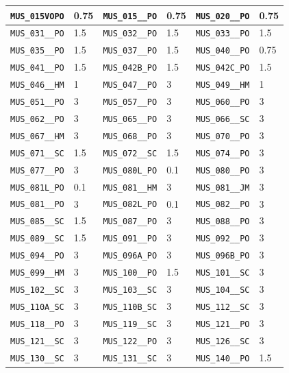 \begin{longtable}{|l|l||l|l||l|l|}
    \verb|MUS_015VOPO| & 0.75 & \verb|MUS_015__PO| & 0.75 & \verb|MUS_020__PO| & 0.75\\\hline
    \verb|MUS_031__PO| & 1.5 & \verb|MUS_032__PO| & 1.5 & \verb|MUS_033__PO| & 1.5\\\hline
    \verb|MUS_035__PO| & 1.5 & \verb|MUS_037__PO| & 1.5 & \verb|MUS_040__PO| & 0.75\\\hline
    \verb|MUS_041__PO| & 1.5 & \verb|MUS_042B_PO| & 1.5 & \verb|MUS_042C_PO| & 1.5\\\hline
    \verb|MUS_046__HM| & 1 & \verb|MUS_047__PO| & 3 & \verb|MUS_049__HM| & 1\\\hline
    \verb|MUS_051__PO| & 3 & \verb|MUS_057__PO| & 3 & \verb|MUS_060__PO| & 3\\\hline
    \verb|MUS_062__PO| & 3 & \verb|MUS_065__PO| & 3 & \verb|MUS_066__SC| & 3\\\hline
    \verb|MUS_067__HM| & 3 & \verb|MUS_068__PO| & 3 & \verb|MUS_070__PO| & 3\\\hline
    \verb|MUS_071__SC| & 1.5 & \verb|MUS_072__SC| & 1.5 & \verb|MUS_074__PO| & 3\\\hline
    \verb|MUS_077__PO| & 3 & \verb|MUS_080L_PO| & 0.1 & \verb|MUS_080__PO| & 3\\\hline
    \verb|MUS_081L_PO| & 0.1 & \verb|MUS_081__HM| & 3 & \verb|MUS_081__JM| & 3\\\hline
    \verb|MUS_081__PO| & 3 & \verb|MUS_082L_PO| & 0.1 & \verb|MUS_082__PO| & 3\\\hline
    \verb|MUS_085__SC| & 1.5 & \verb|MUS_087__PO| & 3 & \verb|MUS_088__PO| & 3\\\hline
    \verb|MUS_089__SC| & 1.5 & \verb|MUS_091__PO| & 3 & \verb|MUS_092__PO| & 3\\\hline
    \verb|MUS_094__PO| & 3 & \verb|MUS_096A_PO| & 3 & \verb|MUS_096B_PO| & 3\\\hline
    \verb|MUS_099__HM| & 3 & \verb|MUS_100__PO| & 1.5 & \verb|MUS_101__SC| & 3\\\hline
    \verb|MUS_102__SC| & 3 & \verb|MUS_103__SC| & 3 & \verb|MUS_104__SC| & 3\\\hline
    \verb|MUS_110A_SC| & 3 & \verb|MUS_110B_SC| & 3 & \verb|MUS_112__SC| & 3\\\hline
    \verb|MUS_118__PO| & 3 & \verb|MUS_119__SC| & 3 & \verb|MUS_121__PO| & 3\\\hline
    \verb|MUS_121__SC| & 3 & \verb|MUS_122__PO| & 3 & \verb|MUS_126__SC| & 3\\\hline
    \verb|MUS_130__SC| & 3 & \verb|MUS_131__SC| & 3 & \verb|MUS_140__PO| & 1.5\\\hline

\end{longtable}
